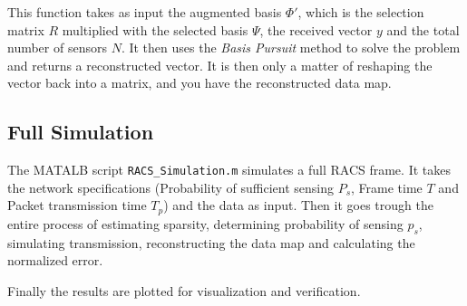 \documentclass[Main]{subfiles}
\begin{document}
		This function takes as input the augmented basis $\Phi'$, which is the selection matrix $R$ multiplied with the selected basis $\Psi$, the received vector $y$ and the total number of sensors $N$.
		It then uses the \emph{Basis Pursuit} method to solve the problem and returns a reconstructed vector.
		It is then only a matter of reshaping the vector back into a matrix, and you have the reconstructed data map.

	

	\subsection{Full Simulation} %
		\label{sub:full_simulation}

		The MATALB script \texttt{RACS\_Simulation.m} simulates a full RACS frame.
		It takes the network specifications (Probability of sufficient sensing $P_s$, Frame time $T$ and Packet transmission time $T_p$) and the data as input.
		Then it goes trough the entire process of estimating sparsity, determining probability of sensing $p_s$, simulating transmission, reconstructing the data map and calculating the normalized error.

		Finally the results are plotted for visualization and verification.
		

\end{document}
